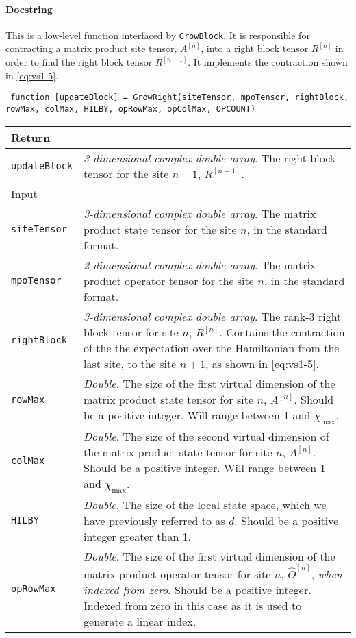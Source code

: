  \paragraph{Docstring} This is a low-level function interfaced by \lstinline$GrowBlock$. It is responsible for contracting a matrix product site tensor, \(A^{[n]}\), into a right block tensor \(R^{[n]}\) in order to find the right block tensor \(R^{[n-1]}\). It implements the contraction shown in \cref{eq:vs1-5}. 
 \begin{lstlisting}
 function [updateBlock] = GrowRight(siteTensor, mpoTensor, rightBlock, rowMax, colMax, HILBY, opRowMax, opColMax, OPCOUNT) \end{lstlisting}
 \begin{longtabu}{X[1,l]X[4,l]}
 \hline
 Return & \\ \hline
 \lstinline$updateBlock$ & \emph{3-dimensional complex double array}. The right block tensor for the site \(n-1\), \(R^{[n-1]}\). \\ \hline
 Input & \\ \hline
 \lstinline$siteTensor$ & \emph{3-dimensional complex double array}. The matrix product state tensor for the site \(n\), in the standard format. \\
 \lstinline$mpoTensor$ & \emph{2-dimensional complex double array}. The matrix product operator tensor for the site \(n\), in the standard format. \\
 \lstinline$rightBlock$ & \emph{3-dimensional complex double array}. The rank-3 right block tensor for site \(n\), \(R^{[n]}\). Contains the contraction of the the expectation over the Hamiltonian from the last site, to the site \(n+1\), as shown in \cref{eq:vs1-5}. \\
 \lstinline$rowMax$ & \emph{Double}. The size of the first virtual dimension of the matrix product state tensor for site \(n\), \(A^{[n]}\). Should be a positive integer. Will range between 1 and \(\chi_{\mathrm{max}}\).\\
 \lstinline$colMax$ & \emph{Double}. The size of the second virtual dimension of the matrix product state tensor for site \(n\), \(A^{[n]}\). Should be a positive integer. Will range between 1 and \(\chi_{\mathrm{max}}\).\\
 \lstinline$HILBY$ & \emph{Double}. The size of the local state space, which we have previously referred to as \(d\). Should be a positive integer greater than 1. \\
 \lstinline$opRowMax$ & \emph{Double}. The size of the first virtual dimension of the matrix product operator tensor for site \(n\), \(\hat{O}^{[n]}\), \emph{when indexed from zero}. Should be a positive integer. Indexed from zero in this case as it is used to generate a linear index. \\

\end{longtabu}
